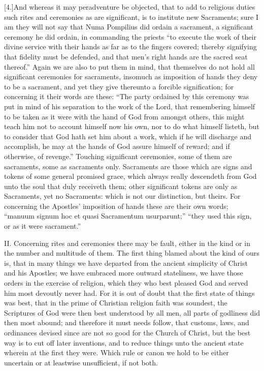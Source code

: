[4.]And whereas it may peradventure be objected, that to add to religious duties such rites and ceremonies as are significant, is to institute new Sacraments; sure I am they will not say that Numa Pompilius did ordain a sacrament, a significant ceremony he did ordain, in commanding the priests “to execute the work of their divine service with their hands as far as to the fingers covered; thereby signifying that fidelity must be defended, and that men’s right hands are the sacred seat thereof.” Again we are also to put them in mind, that themselves do not hold all significant ceremonies for sacraments, insomuch as imposition of hands they deny to be a sacrament, and yet they give thereunto a forcible signification; for concerning it their words are these: “The party ordained by this ceremony was put in mind of his separation to the work of the Lord, that remembering himself to be taken as it were with the hand of God from amongst others, this might teach him not to account himself now his own, nor to do what himself listeth, but to consider that God hath set him about a work, which if he will discharge and accomplish, he may at the hands of God assure himself of reward; and if otherwise, of revenge.” Touching significant ceremonies,  some of them are sacraments, some as sacraments only. Sacraments are those which are signs and tokens of some general promised grace, which always really descendeth from God unto the soul that duly receiveth them; other significant tokens are only as Sacraments, yet no Sacraments: which is not our distinction, but theirs. For concerning the Apostles’ imposition of hands these are their own words; “manuum signum hoc et quasi Sacramentum usurparunt;” “they used this sign, or as it were sacrament.”

II. Concerning rites and ceremonies there may be fault, either in the kind or in the number and multitude of them. The first thing blamed about the kind of ours is, that in many things we have departed from the ancient simplicity of Christ and his Apostles; we have embraced more outward stateliness, we have those orders in the exercise of religion, which they who best pleased God and served him most devoutly never had. For it is out of doubt that the first state of things was best, that in the prime of Christian religion faith was soundest, the Scriptures of God were then best understood by all men, all parts of godliness did then most abound; and therefore it must needs follow, that customs, laws, and ordinances devised since are not so good for the Church of Christ, but the best way is to cut off later inventions, and to reduce things unto the ancient state wherein at the first they were. Which rule or canon we hold to be either uncertain or at leastwise unsufficient, if not both.


